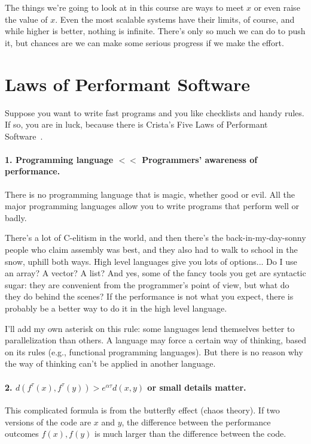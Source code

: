 \documentclass[a4paper]{report}
\begin{document}
The things we're going to look at in this course are ways to meet $x$ or even raise the value of $x$. Even the most scalable systems have their limits, of course, and while higher is better, nothing is infinite. There's only so much we can do to push it, but chances are we can make some serious progress if we make the effort.

\section*{Laws of Performant Software}
Suppose you want to write fast programs and you like checklists and handy rules. If so, you are in luck, because there is Crista's Five Laws of Performant Software~\cite{lpsw}. 

\paragraph{1. Programming language $<<$ Programmers' awareness of performance.}
There is no programming language that is magic, whether good or evil. All the major programming languages allow you to write programs that perform well or badly. 

There's a lot of C-elitism in the world, and then there's the back-in-my-day-sonny people who claim assembly was best, and they also had to walk to school in the snow, uphill both ways.  High level languages give you lots of options... Do I use an array? A vector? A list? And yes, some of the fancy tools you get are syntactic sugar: they are convenient from the programmer's point of view, but what do they do behind the scenes? If the performance is not what you expect, there is probably be a better way to do it in the high level language.

I'll add my own asterisk on this rule: some languages lend themselves better to parallelization than others. A language may force a certain way of thinking, based on its rules (e.g., functional programming languages). But there is no reason why the way of thinking can't be applied in another language.


\paragraph{2. $d(f^{\tau}(x), f^{\tau}(y)) > e^{\alpha\tau} d(x, y)$ or small details matter.} This complicated formula is from the butterfly effect (chaos theory). If two versions of the code are $x$ and $y$, the difference between the performance outcomes $f(x), f(y)$ is much larger than the difference between the code.
\end{document}
